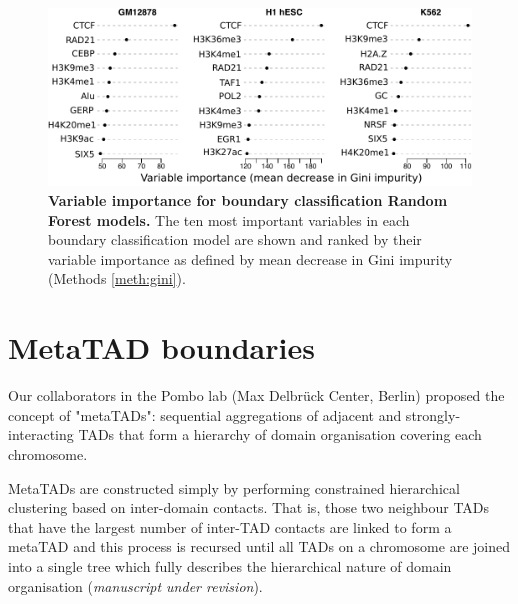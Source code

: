 \documentclass[a4paper,11pt,oneside]{book}
\begin{document}
\begin{figure}
\begin{center} 
\includegraphics[width=5.45in]{figs/tadpred_varimp.pdf}
\captionsetup{width=\textwidth}
\caption[ Variable importance for boundary classification Random Forest models. ]{ {\bf Variable importance for boundary classification Random Forest models. }
The ten most important variables in each boundary classification model are shown and ranked by their variable importance as defined by mean decrease in Gini impurity (Methods \ref{meth:gini}).
}\label{fig:tadpred_varimp}
\end{center}
\end{figure} 

% 

\section{MetaTAD boundaries}\label{sec:metatads}

Our collaborators in the Pombo lab (Max Delbr\"{u}ck Center, Berlin) proposed the concept of "metaTADs": sequential aggregations of adjacent and strongly-interacting TADs that form a hierarchy of domain organisation covering each chromosome.

MetaTADs are constructed simply by performing constrained hierarchical clustering based on inter-domain contacts. That is, those two neighbour TADs that have the largest number of inter-TAD contacts are linked to form a metaTAD and this process is recursed until all TADs on a chromosome are joined into a single tree which fully describes the hierarchical nature of domain organisation (\emph{manuscript under revision}).
\end{document}
